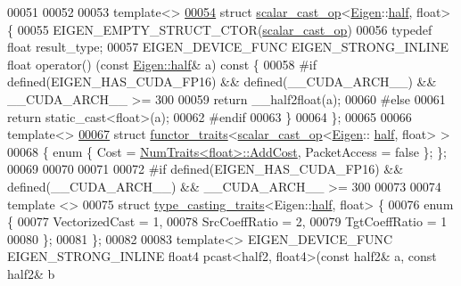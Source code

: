\begin{DoxyCode}
00051 
00052 
00053 \textcolor{keyword}{template}<>
\hyperlink{struct_eigen_1_1internal_1_1scalar__cast__op_3_01_eigen_1_1half_00_01float_01_4}{00054} \textcolor{keyword}{struct }\hyperlink{struct_eigen_1_1internal_1_1scalar__cast__op}{scalar\_cast\_op}<\hyperlink{namespace_eigen}{Eigen}::\hyperlink{struct_eigen_1_1half}{half}, float> \{
00055   EIGEN\_EMPTY\_STRUCT\_CTOR(\hyperlink{struct_eigen_1_1internal_1_1scalar__cast__op}{scalar\_cast\_op})
00056   \textcolor{keyword}{typedef} \textcolor{keywordtype}{float} result\_type;
00057   EIGEN\_DEVICE\_FUNC EIGEN\_STRONG\_INLINE \textcolor{keywordtype}{float} operator() (\textcolor{keyword}{const} \hyperlink{struct_eigen_1_1half}{Eigen::half}& a)\textcolor{keyword}{ const }\{
00058 \textcolor{preprocessor}{    #if defined(EIGEN\_HAS\_CUDA\_FP16) && defined(\_\_CUDA\_ARCH\_\_) && \_\_CUDA\_ARCH\_\_ >= 300}
00059       \textcolor{keywordflow}{return} \_\_half2float(a);
00060 \textcolor{preprocessor}{    #else}
00061       \textcolor{keywordflow}{return} \textcolor{keyword}{static\_cast<}\textcolor{keywordtype}{float}\textcolor{keyword}{>}(a);
00062 \textcolor{preprocessor}{    #endif}
00063   \}
00064 \};
00065 
00066 \textcolor{keyword}{template}<>
\hyperlink{struct_eigen_1_1internal_1_1functor__traits_3_01scalar__cast__op_3_01_eigen_1_1half_00_01float_01_4_01_4}{00067} \textcolor{keyword}{struct }\hyperlink{struct_eigen_1_1internal_1_1functor__traits}{functor\_traits}<\hyperlink{struct_eigen_1_1internal_1_1scalar__cast__op}{scalar\_cast\_op}<\hyperlink{namespace_eigen}{Eigen}::
      \hyperlink{struct_eigen_1_1half}{half}, float> >
00068 \{ \textcolor{keyword}{enum} \{ Cost = \hyperlink{group___core___module_struct_eigen_1_1_num_traits}{NumTraits<float>::AddCost}, PacketAccess = \textcolor{keyword}{false} \}; \};
00069 
00070 
00071 
00072 \textcolor{preprocessor}{#if defined(EIGEN\_HAS\_CUDA\_FP16) && defined(\_\_CUDA\_ARCH\_\_) && \_\_CUDA\_ARCH\_\_ >= 300}
00073 
00074 \textcolor{keyword}{template} <>
00075 \textcolor{keyword}{struct }\hyperlink{struct_eigen_1_1internal_1_1type__casting__traits}{type\_casting\_traits}<Eigen::\hyperlink{struct_eigen_1_1half}{half}, float> \{
00076   \textcolor{keyword}{enum} \{
00077     VectorizedCast = 1,
00078     SrcCoeffRatio = 2,
00079     TgtCoeffRatio = 1
00080   \};
00081 \};
00082 
00083 \textcolor{keyword}{template}<> EIGEN\_DEVICE\_FUNC EIGEN\_STRONG\_INLINE float4 pcast<half2, float4>(\textcolor{keyword}{const} half2& a, \textcolor{keyword}{const} half2& b

\end{DoxyCode}
